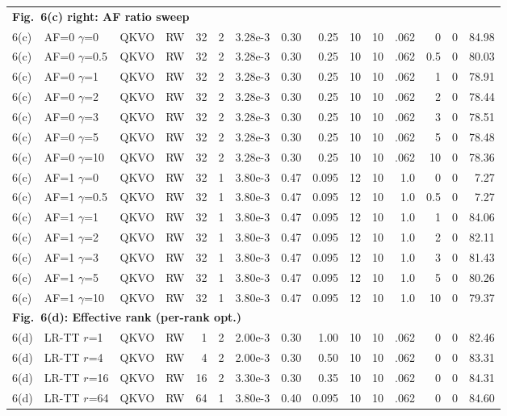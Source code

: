 \documentclass[AMA,LATO1COL]{WileyNJDv5}
\begin{document}
{\begin{longtable}{@{}l l l l r r r r r r r r r r r@{}}
\multicolumn{15}{l}{\cellcolor{HeadGray}\textbf{Fig.~6(c) right: AF ratio sweep}} \\
6(c) & AF=0 $\gamma$=0 & QKVO & RW & 32 & 2 & 3.28e-3 & 0.30 & 0.25 & 10 & 10 & .062 & 0 & 0 & 84.98 \\
6(c) & AF=0 $\gamma$=0.5 & QKVO & RW & 32 & 2 & 3.28e-3 & 0.30 & 0.25 & 10 & 10 & .062 & 0.5 & 0 & 80.03 \\
6(c) & AF=0 $\gamma$=1 & QKVO & RW & 32 & 2 & 3.28e-3 & 0.30 & 0.25 & 10 & 10 & .062 & 1 & 0 & 78.91 \\
6(c) & AF=0 $\gamma$=2 & QKVO & RW & 32 & 2 & 3.28e-3 & 0.30 & 0.25 & 10 & 10 & .062 & 2 & 0 & 78.44 \\
6(c) & AF=0 $\gamma$=3 & QKVO & RW & 32 & 2 & 3.28e-3 & 0.30 & 0.25 & 10 & 10 & .062 & 3 & 0 & 78.51 \\
6(c) & AF=0 $\gamma$=5 & QKVO & RW & 32 & 2 & 3.28e-3 & 0.30 & 0.25 & 10 & 10 & .062 & 5 & 0 & 78.48 \\
6(c) & AF=0 $\gamma$=10 & QKVO & RW & 32 & 2 & 3.28e-3 & 0.30 & 0.25 & 10 & 10 & .062 & 10 & 0 & 78.36 \\
6(c) & AF=1 $\gamma$=0 & QKVO & RW & 32 & 1 & 3.80e-3 & 0.47 & 0.095 & 12 & 10 & 1.0 & 0 & 0 & 7.27 \\
6(c) & AF=1 $\gamma$=0.5 & QKVO & RW & 32 & 1 & 3.80e-3 & 0.47 & 0.095 & 12 & 10 & 1.0 & 0.5 & 0 & 7.27 \\
6(c) & AF=1 $\gamma$=1 & QKVO & RW & 32 & 1 & 3.80e-3 & 0.47 & 0.095 & 12 & 10 & 1.0 & 1 & 0 & 84.06 \\
6(c) & AF=1 $\gamma$=2 & QKVO & RW & 32 & 1 & 3.80e-3 & 0.47 & 0.095 & 12 & 10 & 1.0 & 2 & 0 & 82.11 \\
6(c) & AF=1 $\gamma$=3 & QKVO & RW & 32 & 1 & 3.80e-3 & 0.47 & 0.095 & 12 & 10 & 1.0 & 3 & 0 & 81.43 \\
6(c) & AF=1 $\gamma$=5 & QKVO & RW & 32 & 1 & 3.80e-3 & 0.47 & 0.095 & 12 & 10 & 1.0 & 5 & 0 & 80.26 \\
6(c) & AF=1 $\gamma$=10 & QKVO & RW & 32 & 1 & 3.80e-3 & 0.47 & 0.095 & 12 & 10 & 1.0 & 10 & 0 & 79.37 \\
\midrule

\multicolumn{15}{l}{\cellcolor{HeadGray}\textbf{Fig.~6(d): Effective rank (per-rank opt.)}} \\
6(d) & LR-TT $r$=1 & QKVO & RW & 1 & 2 & 2.00e-3 & 0.30 & 1.00 & 10 & 10 & .062 & 0 & 0 & 82.46 \\
6(d) & LR-TT $r$=4 & QKVO & RW & 4 & 2 & 2.00e-3 & 0.30 & 0.50 & 10 & 10 & .062 & 0 & 0 & 83.31 \\
6(d) & LR-TT $r$=16 & QKVO & RW & 16 & 2 & 3.30e-3 & 0.30 & 0.35 & 10 & 10 & .062 & 0 & 0 & 84.31 \\
6(d) & LR-TT $r$=64 & QKVO & RW & 64 & 1 & 3.80e-3 & 0.40 & 0.095 & 10 & 10 & .062 & 0 & 0 & 84.60 \\
\midrule


\end{longtable}}
\end{document}
